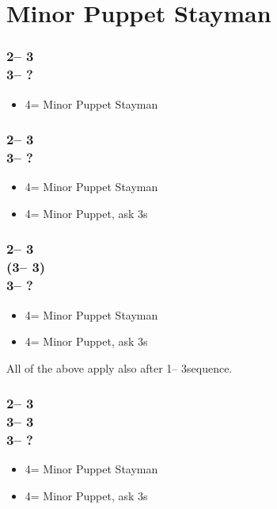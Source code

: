 \documentclass[12pt, a4paper]{report}
\begin{document}
\section*{\colorbox{blue!30}{Minor Puppet Stayman}}
 {
    \subsubsection*{2\nt -- 3\clubs\\
                3\diams -- ?}
    \begin{itemize}
        \item 4\clubs = Minor Puppet Stayman
    \end{itemize}

    \subsubsection*{2\nt -- 3\clubs\\
                    3\major -- ?}
    \begin{itemize}
        \item 4\clubs = Minor Puppet Stayman
        \item 4\diams = Minor Puppet, ask 3s
    \end{itemize}

    \subsubsection*{2\nt -- 3\clubs\\
                    (3\diams -- 3\major)\\
                    3\nt -- ?}
    \begin{itemize}
        \item 4\clubs = Minor Puppet Stayman
        \item 4\diams = Minor Puppet, ask 3s
    \end{itemize}

    All of the above apply also after 1\nt -- 3\clubs sequence.

    \subsubsection*{2\nt -- 3\diams\\
                    3\hearts -- 3\spades\\
                    3\nt -- ?}
    \begin{itemize}
        \item 4\clubs = Minor Puppet Stayman
        \item 4\diams = Minor Puppet, ask 3s
    \end{itemize}

}
\end{document}
